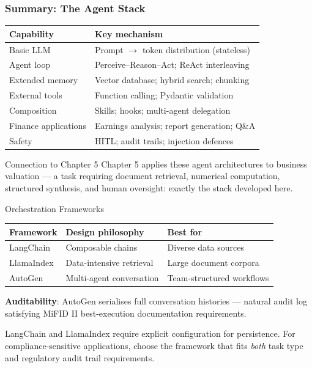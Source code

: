 \documentclass[9pt,t]{beamer}
\begin{document}
\begin{frame}
\frametitle{Summary: The Agent Stack}

\begin{center}
\begin{tabular}{ll}
\toprule
\textbf{Capability} & \textbf{Key mechanism} \\
\midrule
Basic LLM & Prompt $\to$ token distribution (stateless) \\
Agent loop & Perceive--Reason--Act; ReAct interleaving \\
Extended memory & Vector database; hybrid search; chunking \\
External tools & Function calling; Pydantic validation \\
Composition & Skills; hooks; multi-agent delegation \\
Finance applications & Earnings analysis; report generation; Q\&A \\
Safety & HITL; audit trails; injection defences \\
\bottomrule
\end{tabular}
\end{center}

\medskip
\begin{block}{Connection to Chapter 5}
Chapter 5 applies these agent architectures to business valuation ---
a task requiring document retrieval, numerical computation, structured synthesis,
and human oversight: exactly the stack developed here.
\end{block}
\end{frame}


\begin{frame}[noframenumbering]{Orchestration Frameworks}
\begin{center}
\begin{tabular}{lll}
\toprule
\textbf{Framework} & \textbf{Design philosophy} & \textbf{Best for} \\
\midrule
LangChain & Composable chains & Diverse data sources \\
LlamaIndex & Data-intensive retrieval & Large document corpora \\
AutoGen & Multi-agent conversation & Team-structured workflows \\
\bottomrule
\end{tabular}
\end{center}

\medskip
\textbf{Auditability}: AutoGen serialises full conversation histories --- natural
audit log satisfying MiFID II best-execution documentation requirements.

\medskip
LangChain and LlamaIndex require explicit configuration for persistence.
For compliance-sensitive applications, choose the framework that fits
\emph{both} task type and regulatory audit trail requirements.
\end{frame}
\end{document}
